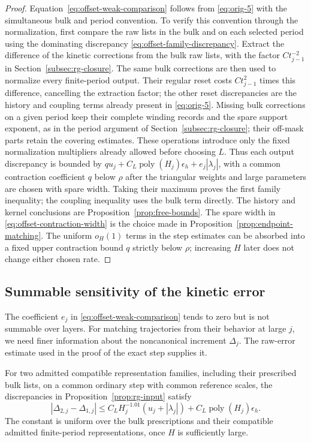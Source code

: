\begin{proof}
Equation~\eqref{eq:offset-weak-comparison} follows from
\eqref{eq:orig-5} with the simultaneous bulk and period convention.
To verify this convention through the normalization, first compare
the raw lists in the bulk and on each selected period using the
dominating discrepancy \eqref{eq:offset-family-discrepancy}.
Extract the difference of the kinetic corrections from the bulk raw
lists, with the factor $Ct_{j-1}^{-2}$ in
Section~\ref{subsec:rg-closure}.  The same bulk corrections are then
used to normalize every finite-period output.  Their regular reset
costs $Ct_{j-1}^{2}$ times this difference, cancelling the extraction
factor; the other reset discrepancies are the history and coupling
terms already present in \eqref{eq:orig-5}.  Missing bulk corrections
on a given period keep their complete winding records and the spare
support exponent, as in the period argument of
Section~\ref{subsec:rg-closure}; their off-mask parts retain the
covering estimates.  These operations introduce only the fixed
normalization multipliers already allowed before choosing $L$.
Thus each output discrepancy is bounded by
$qu_j+C_L\operatorname{poly}(H_j)\epsilon_h+e_j|\lambda_j|$,
with a common contraction coefficient $q$ below $\rho$ after the
triangular weights and large parameters are chosen with spare width.
Taking their maximum proves the first family inequality;
the coupling inequality uses the bulk term directly.
The history and kernel conclusions are
Proposition~\ref{prop:free-bounds}.  The spare width in
\eqref{eq:offset-contraction-width} is the choice made in
Proposition~\ref{prop:endpoint-matching}.  The uniform $o_H(1)$
terms in the step estimates can be absorbed into a fixed upper
contraction bound $q$ strictly below $\rho$; increasing $H$ later
does not change either chosen rate.
\end{proof}

\subsection{Summable sensitivity of the kinetic error}

The coefficient $e_j$ in
\eqref{eq:offset-weak-comparison} tends to zero but is not summable
over layers.  For matching trajectories from their behavior at large
$j$, we need finer information about the noncanonical increment
$\Delta_j$.  The raw-error estimate used in the proof of the exact
step supplies it.

\begin{lemma}
\label{lem:sensitivity}
For two admitted compatible representation families, including their
prescribed bulk lists, on a common ordinary step with common reference
scales, the discrepancies in
Proposition~\ref{prop:rg-input} satisfy
\begin{equation}
 |\Delta_{2,j}-\Delta_{1,j}|
 \le C_L H_j^{-1.01}(u_j+|\lambda_j|)
             +C_L\operatorname{poly}(H_j)\epsilon_h.
 \label{eq:offset-sensitivity}
\end{equation}
The constant is uniform over the bulk prescriptions and their
compatible admitted finite-period representations, once $H$ is
sufficiently large.
\end{lemma}


